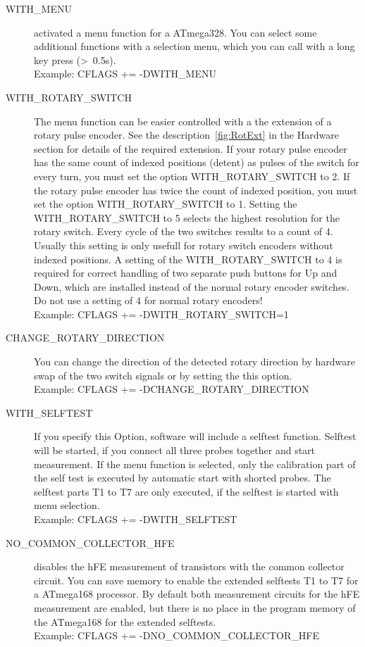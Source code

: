 \begin{description}
  \item[WITH\_MENU] activated a menu function for a ATmega328. You can select some additional functions with a
selection menu, which you can call with a long key press (\textgreater~0.5s).\\
Example: CFLAGS += -DWITH\_MENU

  \item[WITH\_ROTARY\_SWITCH] The menu function can be easier controlled with a the extension of a rotary pulse encoder.
See the description~\ref{fig:RotExt} in the Hardware section for details of the required extension.
If your rotary pulse encoder has the same count of indexed positions (detent) as pulses of the switch for every turn, you must
set the  option WITH\_ROTARY\_SWITCH to 2. If the rotary pulse encoder has twice the count of indexed position, you must
set the option WITH\_ROTARY\_SWITCH to 1.
Setting the WITH\_ROTARY\_SWITCH to 5 selects the highest resolution for the rotary switch. Every cycle of the two switches results
to a count of 4. Usually this setting is only usefull for rotary switch encoders without indexed positions.
A setting of the WITH\_ROTARY\_SWITCH to 4 is required for correct handling of two separate push buttons for Up and Down,
which are installed instead of the normal rotary encoder switches.
Do not use a setting of 4 for normal rotary encoders!\\
Example: CFLAGS += -DWITH\_ROTARY\_SWITCH=1

  \item[CHANGE\_ROTARY\_DIRECTION] You can change the direction of the detected rotary direction by hardware swap of
the two switch signals or by setting the this option.\\
Example: CFLAGS += -DCHANGE\_ROTARY\_DIRECTION

  \item[WITH\_SELFTEST] If you specify this Option, software will include a selftest function.
Selftest will be started, if you connect all three probes together and start measurement.
If the menu function is selected, only the calibration part of the self test is executed by automatic start with
shorted probes. The selftest parts T1 to T7 are only executed, if the selftest is started with menu selection.\\
Example: CFLAGS += -DWITH\_SELFTEST

  \item[NO\_COMMON\_COLLECTOR\_HFE] disables the hFE measurement of transistors with the common collector circuit.
You can save memory to enable the extended selftests T1 to T7 for a ATmega168 processor.
By default both measurement circuits for the hFE measurement are enabled, 
but there is no place in the program memory of the ATmega168 for the extended selftests.\\
Example: CFLAGS += -DNO\_COMMON\_COLLECTOR\_HFE


\end{description}

